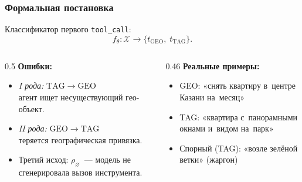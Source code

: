 \documentclass[aspectratio=169]{beamer}
\begin{document}
\begin{frame}
\frametitle{Формальная постановка}
Классификатор первого \texttt{tool\_call}:
\[
  f_\theta\colon \mathcal{X} \to \{t_{\mathrm{GEO}},\; t_{\mathrm{TAG}}\}.
\]
\begin{columns}[T]
\begin{column}{0.5\textwidth}
\textbf{Ошибки:}
\begin{itemize}
  \item \emph{I рода:} $\mathrm{TAG}\!\to\!\mathrm{GEO}$ \\ агент ищет несуществующий гео-объект.
  \item \emph{II рода:} $\mathrm{GEO}\!\to\!\mathrm{TAG}$ \\ теряется географическая привязка.
  \item Третий исход: $\rho_\varnothing$~— модель не сгенерировала вызов инструмента.
\end{itemize}
\end{column}
\begin{column}{0.46\textwidth}
\textbf{Реальные примеры:}
\begin{itemize}
  \item GEO: «снять квартиру в~центре Казани на~месяц»
  \item TAG: «квартира с~панорамными окнами и~видом на~парк»
  \item Спорный (TAG): «возле зелёной ветки» (жаргон)
\end{itemize}
\end{column}
\end{columns}
\end{frame}
\end{document}
